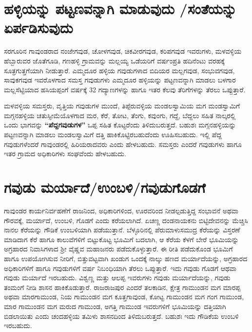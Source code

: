 \section{ಹಳ್ಳಿಯನ್ನು ಪಟ್ಟಣವನ್ನಾಗಿ ಮಾಡುವುದು /ಸಂತೆಯನ್ನು ಏರ್ಪಡಿಸುವುದು}

\vskip 2pt

ಸರಗೂರಿನ ಗಾವುಂಡರಾದ ನಂಜೇಗವುಡ, ಚೋಳಗವುಡ, ಚಿಕವೀರಗವುಡ, ಕರಿಪಗವುಡ ಇವರುಗಳು, ಮಳವಳ್ಳಿಯ ಹೆಬ್ಬಾರುವರ ಜೊತೆಗೂಡಿ, ಗಣಹಳ್ಳಿ ಗ್ರಾಮವನ್ನು ಮಲ್ಲಯ್ಯ ಒಡೆಯರಿಗೆ ವರ್ಷಂಪ್ರತಿ ಹದಿನೆಂಟು ವರಹಕ್ಕೆ ಸೂತ್ರಗುತ್ತಗೆ\-ಯಾಗಿ ನೀಡುತ್ತಾರೆ. ಎಮ್ಮದೂರ ಹಳ್ಳಿಯ ಗವುಡುಗಳಾದ ಬಿದಿಯರ ಮಲ್ಲಗವುಡ, ಸಂಭುವಗವುಡ, ಸಾವುಕಗವುಡ ಇವರೊಳಗಾದ ಸಮಸ್ತ ಗವುಡುಗಳು ಎಮ್ಮದೂರ ಹಳ್ಳಿಯನ್ನು ಪಟ್ಟಣವನ್ನಾಗಿ ಮಾಡಲು ಬಳಗಾರ ಮಲ್ಲಸೆಟ್ಟಿಯಾದ ಹಸಿಯಪ್ಪಂಗೆ ವರ್ಷಕ್ಕೆ 32 ಗದ್ಯಾಣಗಳನ್ನು ಹಾಗೂ ಇತರ ಕೆಲವು ತೆರಿಗೆಗಳನ್ನು ತೆರಲು ಒಪ್ಪುತ್ತಾರೆ.

\vskip 2pt

ಮಳವಳ್ಳಿಯ ಸಮಸ್ತರು, ವೃತ್ತಿಯ ಗವುಡುಗಳ ಮುಂದೆ, ತಿಪ್ಪೆರುವಳ್ಳಿಯ ಮಂಡಲಸ್ವಾಮಿಯ ಮಗ ಮಂಡಸ್ವಾಮಿಗೆ ಮಗ್ಗನಹಳ್ಳಿಯ ಚತುಸ್ಸೀಮೆಯೊಳಗಾದ ಮರ, ಕೆರೆ, ತೋಟ, ತೆಂಗು, ಕವುಂಗು, ಗದ್ದೆ, ಬೆದ್ದಲು ಸಹಿತ ನಾಲ್ಕರಲ್ಲಿ ಒಂದು ಭಾಗವನ್ನು \textbf{“ಪೆದ್ದಗವುಡುಗಳ”} ಒಪ್ಪ ಸಹಿತ ಕೊಟ್ಟರೆಂದು ತಿಳಿದುಬರುತ್ತದೆ. ಬಹುಶಃ ಮಗ್ಗನಹಳ್ಳಿಯನ್ನು ಪಟ್ಟಣವನ್ನಾಗಿ ಮಾಡಲು ಮಂಡಲಸ್ವಾಮಿಗೆ ದತ್ತಿ ಹಾಕಿಕೊಟ್ಟಿರಬಹುದೆಂದು ಊಹಿಸಬಹುದು. ಇಲ್ಲಿ ಪೆದ್ದ ಗವುಡುಗಳೆಂದರೆ ಗಾವುಂಡರಲ್ಲಿ ಹಿರಿಯರಾದವರು ಎಂದು ಹೇಳಬಹುದು. ಸಮಸ್ತರು ಎಂದರೆ ಗವುಡುಗಳು ಹಾಗೂ ಇತರ ಗ್ರಾಮದ ಅಧಿಕಾರಿಗಳು ಸಂಘ\-ವೆಂದು ಹೇಳಬಹುದು.


\section{ಗವುಡು ಮರ್ಯಾದೆ/ಉಂಬಳಿ/ಗವುಡುಗೊಡಗೆ}

ಗಾವುಂಡರ ಕಾರ್ಯನಿರ್ವಹಣೆಗೆ ರಾಜನಿಂದ, ಅಧಿಕಾರಿಗಳಿಂದ, ಊರವರಿಂದ ನೀಡಲ್ಪಡುತ್ತಿದ್ದ ಸಂಭಾವನೆ ಅಥವಾ ಗೌರವಕ್ಕೆ, ಮರ್ಯಾದೆ, ಉಂಬಳಿ, ಗೊಡಗೆ ಎಂದು ಕರೆಯಲಾಗಿದೆ. ಏಚಣ್ಣ ದಂಡನಾಯಕನು ಬಿಟ್ಟಿದೇವನನ್ನು ಮೆಚ್ಚಿಸಿ ನಾನಲ ಕೆರೆಯನ್ನು ಗೌಡಿಕೆ ಉಂಬಳಿಯಾಗಿ ಪಡೆಯುತ್ತಾನೆ. ಬೆಳ್ಳೂರಿನಲ್ಲಿ ಪೆರುಮಾಳುಸಮುದ್ರ ಕೆರೆಯನ್ನು ವಿಸ್ತರಣೆ ಮಾಡಿದಾಗ ಕೆರೆ ಹಾಗೂ ಕಾಲುವೆಗಳಿಗೆ ಬಿಟ್ಟುಕೊಟ್ಟ ಭೂಮಿಗೆ ಬದಲಾಗಿ, ಆ ಕೆರೆಯ ಕೆಳಗೆ ಬೇರೆ ಭೂಮಿಯನ್ನು ಅಗ್ರಹಾರದ ನಿವಾಸಿಗಳಾದ ಶ‍್ರೀ ವೈಷ್ಣವ ಮಹಾಜನರು ಪಡೆದುಕೊಳ್ಳುತ್ತಾರೆ. ಈ ರೀತಿ ಪಡೆದುಕೊಂಡ ಭೂಮಿಗೆ ಹಾಗೂ ಉಪಯೋಗಿಸುವ ನೀರಿಗೆ, ಬಿತ್ತುವಟ್ಟವಾಗಿ ಖಂಡುಗ ಒಂದಕ್ಕೆ ನಾಲ್ಕು ಹಣದ ಮರ್ಯಾದೆಯನ್ನು, ಅಗ್ರಹಾರದ ಅಧಿಕಾರಿಗಳಿಗೆ ಹಾಗೂ ಗವುಡುಗಳಿಗೆ ವರ್ಷ ನಿಬಂಧಿಯಾಗಿ ತೆರಲು ಒಪ್ಪುತ್ತಾರೆ. ಇದು ಗವುಡು ಗೊಡಗೆ ಆಥವಾ ಗವುಡು ಮರ್ಯಾದೆ ಇರಬಹುದು. ವಿಶ್ವಣ್ಣ ಮತ್ತು ಆಲಪ್ಪ ಇವರುಗಳು ಗವುಡು ಮರ್ಯಾದೆಯನ್ನು, ಗವುಡು ತಂಮಂಗೆ ನೀಡಿ ಶಾಸನ ಹಾಕಿಕೊಡುತ್ತಾರೆ. ರಾಜರಾಜಪುರ ಎಂದರೆ ತಲಕಾಡಿನ, ಕ್ಷೇತ್ರ ಗಾಮುಂಡನ ಮಗ ಮಾರಪ್ಪ ಅಥವಾ ಮಾರಗಾಮುಂಡ, ನಿಯ ಗಾಮುಂಡನ ಮಗ ಕೂತ್ತಗಾವುಂಡ, ಕೋಟ್ಟ ಗಾಮುಂಡನ ಮಗ ಗಂಗ ಗಾಮುಂಡ, ಮಾರ ಗಾಮುಂಡನ ಮಗ ಮರುದ ಗಾಮುಂಡ, ಅಗತ್ತಿ ಗಾಮುಂಡ ಇವರುಗಳಿಗೆ ಭೂಮಿಯನ್ನು ದತ್ತಿಯಾಗಿ ಬಿಡಲಾಯಿತು ಎಂದು ಚಂದಹಳ್ಳಿಯ ತಮಿಳು ಶಾಸನದಿಂದ ತಿಳಿದುಬರುತ್ತದೆ. ಬಹುಶಃ ಇದು ಗೌಡಿಕೆಯ ಉಂಬಳಿ ಇರಬಹುದು.


